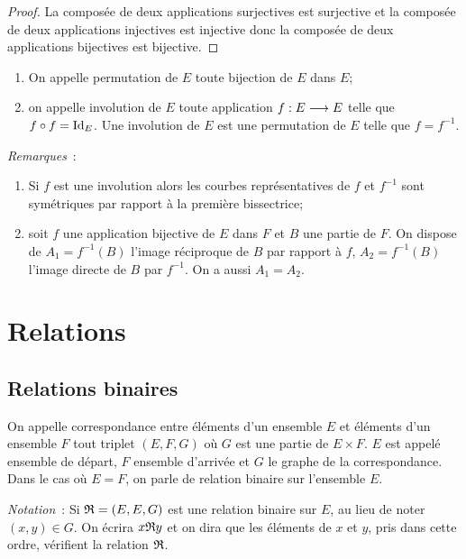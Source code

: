 \begin{proof}
    La composée de deux applications surjectives est surjective et la composée de 
    deux applications injectives est injective donc la composée de deux applications 
    bijectives est bijective.
\end{proof}

\begin{defdef}
    \begin{enumerate}
        \item On appelle permutation de \(E\) toute bijection de \(E\) dans \(E\);
        \item on appelle involution de \(E\) toute application 
            \(f:E \longrightarrow E\) telle que \(f \circ f=\operatorname{Id}_E\). Une 
            involution de \(E\) est une permutation de \(E\) telle que 
            \(f=f^{-1}\).
    \end{enumerate}
\end{defdef}

\emph{Remarques}~:
\begin{enumerate}
    \item Si \(f\) est une involution alors les courbes représentatives de \(f\) 
        et \(f^{-1}\) sont symétriques par rapport à la première bissectrice;
    \item soit \(f\) une application bijective de \(E\) dans \(F\) et \(B\) une 
        partie de \(F\). On dispose de \(A_1=f^{-1}(B)\) l'image réciproque de 
        \(B\) par rapport à \(f\), \(A_2=f^{-1}(B)\) l'image directe de \(B\) 
        par \(f^{-1}\). On a aussi \(A_1=A_2\).
\end{enumerate}

\section{Relations}
\label{chap3-sec:relations}

\subsection{Relations binaires}
\label{chap3-subsec:relationbinaire}

\begin{defdef}
    On appelle correspondance entre éléments d'un ensemble \(E\) et éléments 
    d'un ensemble \(F\) tout triplet \((E,F,G)\) où \(G\) est une partie de \(E 
    \times F\). \(E\) est appelé ensemble de départ, \(F\) ensemble d'arrivée et 
    \(G\) le graphe de la correspondance. Dans le cas où \(E=F\), on parle de 
    relation binaire sur l'ensemble \(E\).
\end{defdef}
\emph{Notation}~: Si \(\mathfrak{R}=(E,E,G)\) est une relation binaire sur \(E\), au 
lieu de noter \((x,y) \in G\). On écrira \(x\mathfrak{R}{}y\) et on dira que les 
éléments de \(x\) et \(y\), pris dans cette ordre, vérifient la relation 
\(\mathfrak{R}\).

